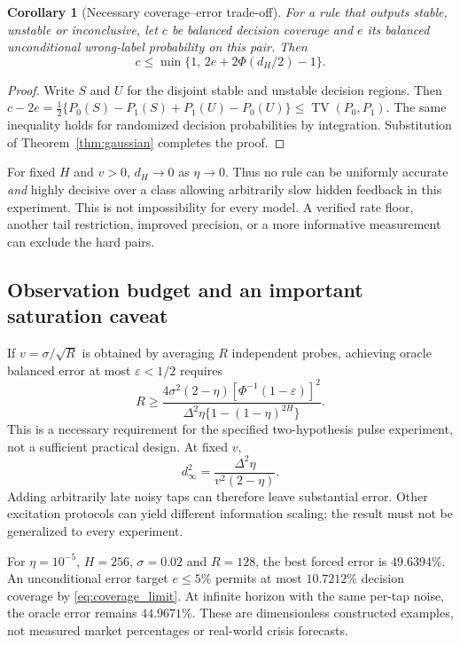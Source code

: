 \documentclass[11pt]{article}
\newtheorem{corollary}[proposition]{Corollary}
\theoremstyle{remark}\newtheorem{remark}[proposition]{Remark}
\newcommand{\TV}{\operatorname{TV}}\newcommand{\N}{\mathcal N}
\begin{document}
\begin{corollary}[Necessary coverage--error trade-off]\label{cor:abstain}
For a rule that outputs stable, unstable or inconclusive, let $c$ be balanced decision coverage and $e$ its balanced \emph{unconditional} wrong-label probability on this pair. Then
\begin{equation}
 c\le\min\{1,\,2e+2\Phi(d_H/2)-1\}.\label{eq:coverage_limit}
\end{equation}
\end{corollary}
\begin{proof}
Write $S$ and $U$ for the disjoint stable and unstable decision regions. Then
$c-2e=\tfrac12\{P_0(S)-P_1(S)+P_1(U)-P_0(U)\}\le\TV(P_0,P_1)$.
The same inequality holds for randomized decision probabilities by integration. Substitution of Theorem~\ref{thm:gaussian} completes the proof.
\end{proof}

For fixed $H$ and $v>0$, $d_H\to0$ as $\eta\to0$. Thus no rule can be uniformly accurate \emph{and} highly decisive over a class allowing arbitrarily slow hidden feedback in this experiment. This is not impossibility for every model. A verified rate floor, another tail restriction, improved precision, or a more informative measurement can exclude the hard pairs.

\subsection{Observation budget and an important saturation caveat}
If $v=\sigma/\sqrt R$ is obtained by averaging $R$ independent probes, achieving oracle balanced error at most $\varepsilon<1/2$ requires
\begin{equation}
 R\ge\frac{4\sigma^2(2-\eta)[\Phi^{-1}(1-\varepsilon)]^2}
 {\Delta^2\eta\{1-(1-\eta)^{2H}\}}.\label{eq:budget}
\end{equation}
This is a necessary requirement for the specified two-hypothesis pulse experiment, not a sufficient practical design. At fixed $v$,
\begin{equation}
 d_\infty^2=\frac{\Delta^2\eta}{v^2(2-\eta)}.
\end{equation}
Adding arbitrarily late noisy taps can therefore leave substantial error. Other excitation protocols can yield different information scaling; the result must not be generalized to every experiment.

For $\eta=10^{-5}$, $H=256$, $\sigma=0.02$ and $R=128$, the best forced error is $49.6394\%$. An unconditional error target $e\le5\%$ permits at most $10.7212\%$ decision coverage by \eqref{eq:coverage_limit}. At infinite horizon with the same per-tap noise, the oracle error remains $44.9671\%$. These are dimensionless constructed examples, not measured market percentages or real-world crisis forecasts.
\end{document}
